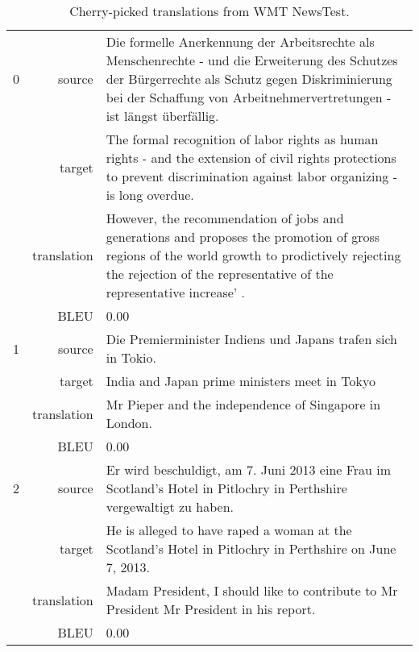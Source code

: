 \begin{table}[h]
\centering
\begin{tabular}{l|r|p{10cm}}
0 & source & Die formelle Anerkennung der Arbeitsrechte als Menschenrechte - und die Erweiterung des Schutzes der Bürgerrechte als Schutz gegen Diskriminierung bei der Schaffung von Arbeitnehmervertretungen - ist längst überfällig. \\[0.1cm]
& target & The formal recognition of labor rights as human rights - and the extension of civil rights protections to prevent discrimination against labor organizing - is long overdue. \\[0.1cm]
& translation & However, the recommendation of jobs and generations and proposes the promotion of gross regions of the world growth to prodictively rejecting the rejection of the representative of the representative increase' . \\[0.1cm]
& BLEU & 0.00 \\[0.1cm] \hline

1 & source & Die Premierminister Indiens und Japans trafen sich in Tokio. \\[0.1cm]
& target & India and Japan prime ministers meet in Tokyo \\[0.1cm]
& translation & Mr Pieper and the independence of Singapore in London. \\[0.1cm]
& BLEU & 0.00 \\[0.1cm] \hline

2 & source & Er wird beschuldigt, am 7. Juni 2013 eine Frau im Scotland's Hotel in Pitlochry in Perthshire vergewaltigt zu haben. \\[0.1cm]
& target & He is alleged to have raped a woman at the Scotland's Hotel in Pitlochry in Perthshire on June 7, 2013. \\[0.1cm]
& translation & Madam President, I should like to contribute to Mr President Mr President in his report. \\[0.1cm]
& BLEU & 0.00 \\[0.1cm]
\end{tabular}
\caption{Cherry-picked translations from WMT NewsTest.}
\label{table:result:bytenet-small:translations}
\end{table}

